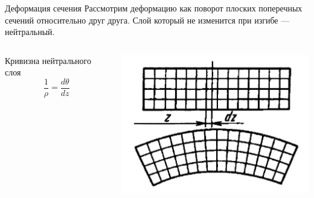 \documentclass[ignoreonframetext,unicode]{beamer}
\begin{document}
	\begin{frame}{Деформация сечения}
		Рассмотрим деформацию как поворот плоских поперечных сечений относительно друг друга. Слой который не изменится при изгибе --- нейтральный.
		\begin{columns}
			\begin{block}{Кривизна нейтрального слоя}	
				\[
				\frac {1}{\rho} = \frac {d\theta}{dz}
				\]
			\end{block}
			\includegraphics[width=\textwidth]{pic.3}
		\end{columns}
	\end{frame}
\end{document}
